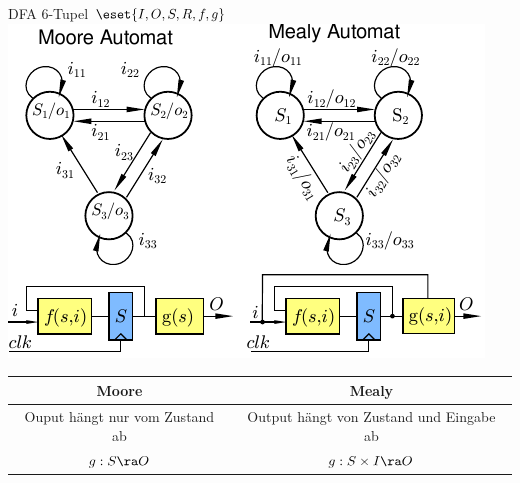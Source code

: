 \documentclass[6pt,a4paper]{scrartcl}
\begin{document}
\begin{multicols}{3}
{DFA 6-Tupel $\eset{I, O, S, R, f, g}$ \\



\includegraphics{./img/ds/automaten.pdf}\\


\begin{tabular}{c | c}
 Moore & Mealy \\ \midrule
 Ouput hängt nur vom Zustand ab & Output hängt von Zustand und Eingabe ab\\
 $g: S \ra O$ & $g: S \times I \ra O$
\end{tabular}

}

\end{multicols}
\end{document}
